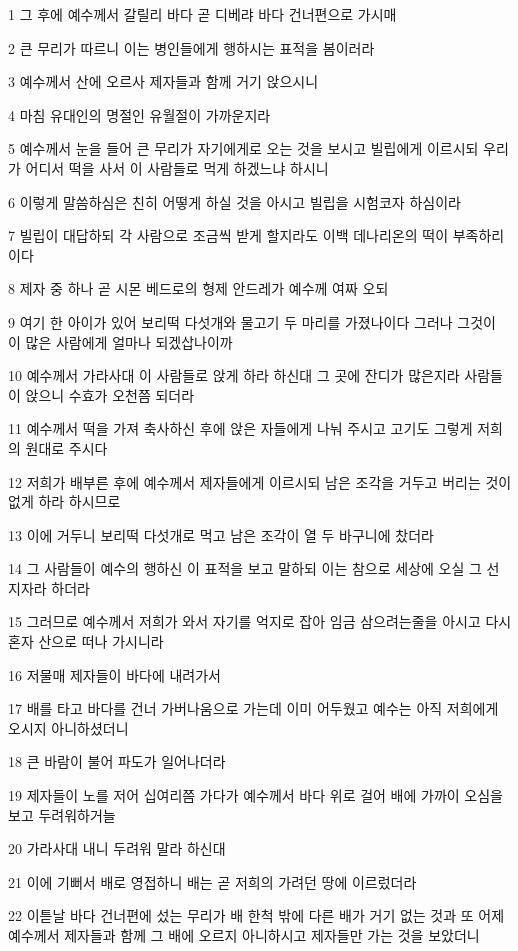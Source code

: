\par 1 그 후에 예수께서 갈릴리 바다 곧 디베랴 바다 건너편으로 가시매
\par 2 큰 무리가 따르니 이는 병인들에게 행하시는 표적을 봄이러라
\par 3 예수께서 산에 오르사 제자들과 함께 거기 앉으시니
\par 4 마침 유대인의 명절인 유월절이 가까운지라
\par 5 예수께서 눈을 들어 큰 무리가 자기에게로 오는 것을 보시고 빌립에게 이르시되 우리가 어디서 떡을 사서 이 사람들로 먹게 하겠느냐 하시니
\par 6 이렇게 말씀하심은 친히 어떻게 하실 것을 아시고 빌립을 시험코자 하심이라
\par 7 빌립이 대답하되 각 사람으로 조금씩 받게 할지라도 이백 데나리온의 떡이 부족하리이다
\par 8 제자 중 하나 곧 시몬 베드로의 형제 안드레가 예수께 여짜 오되
\par 9 여기 한 아이가 있어 보리떡 다섯개와 물고기 두 마리를 가졌나이다 그러나 그것이 이 많은 사람에게 얼마나 되겠삽나이까
\par 10 예수께서 가라사대 이 사람들로 앉게 하라 하신대 그 곳에 잔디가 많은지라 사람들이 앉으니 수효가 오천쯤 되더라
\par 11 예수께서 떡을 가져 축사하신 후에 앉은 자들에게 나눠 주시고 고기도 그렇게 저희의 원대로 주시다
\par 12 저희가 배부른 후에 예수께서 제자들에게 이르시되 남은 조각을 거두고 버리는 것이 없게 하라 하시므로
\par 13 이에 거두니 보리떡 다섯개로 먹고 남은 조각이 열 두 바구니에 찼더라
\par 14 그 사람들이 예수의 행하신 이 표적을 보고 말하되 이는 참으로 세상에 오실 그 선지자라 하더라
\par 15 그러므로 예수께서 저희가 와서 자기를 억지로 잡아 임금 삼으려는줄을 아시고 다시 혼자 산으로 떠나 가시니라
\par 16 저물매 제자들이 바다에 내려가서
\par 17 배를 타고 바다를 건너 가버나움으로 가는데 이미 어두웠고 예수는 아직 저희에게 오시지 아니하셨더니
\par 18 큰 바람이 불어 파도가 일어나더라
\par 19 제자들이 노를 저어 십여리쯤 가다가 예수께서 바다 위로 걸어 배에 가까이 오심을 보고 두려워하거늘
\par 20 가라사대 내니 두려워 말라 하신대
\par 21 이에 기뻐서 배로 영접하니 배는 곧 저희의 가려던 땅에 이르렀더라
\par 22 이튿날 바다 건너편에 섰는 무리가 배 한척 밖에 다른 배가 거기 없는 것과 또 어제 예수께서 제자들과 함께 그 배에 오르지 아니하시고 제자들만 가는 것을 보았더니
